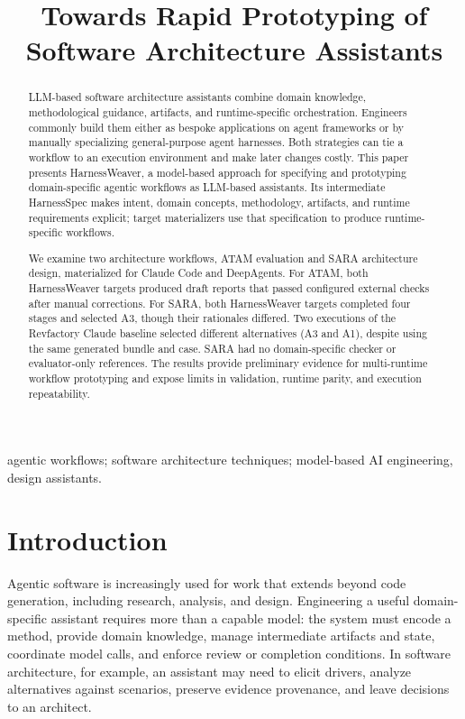 \documentclass[10pt,conference]{IEEEtran}
\title{Towards Rapid Prototyping of Software Architecture Assistants}
\author{\IEEEauthorblockN{Anonymous Author(s)}
}
\begin{document}
\maketitle
\begin{abstract}
LLM-based software architecture assistants combine domain knowledge, methodological guidance, artifacts, and runtime-specific orchestration. Engineers commonly build them either as bespoke applications on agent frameworks or by manually specializing general-purpose agent harnesses. Both strategies can tie a workflow to an execution environment and make later changes costly. This paper presents HarnessWeaver, a model-based approach for specifying and prototyping domain-specific agentic workflows as LLM-based assistants. Its intermediate HarnessSpec makes intent, domain concepts, methodology, artifacts, and runtime requirements explicit; target materializers use that specification to produce runtime-specific workflows.

We examine two architecture workflows, ATAM evaluation and SARA architecture design, materialized for Claude Code and DeepAgents. For ATAM, both HarnessWeaver targets produced draft reports that passed configured external checks after manual corrections. For SARA, both HarnessWeaver targets completed four stages and selected A3, though their rationales differed. Two executions of the Revfactory Claude baseline selected different alternatives (A3 and A1), despite using the same generated bundle and case. SARA had no domain-specific checker or evaluator-only references. The results provide preliminary evidence for multi-runtime workflow prototyping and expose limits in validation, runtime parity, and execution repeatability.
\end{abstract}
\begin{IEEEkeywords}
agentic workflows; software architecture techniques; model-based AI engineering, design assistants.
\end{IEEEkeywords}
\section{Introduction}

Agentic software is increasingly used for work that extends beyond code generation, including research, analysis, and design. Engineering a useful domain-specific assistant requires more than a capable model: the system must encode a method, provide domain knowledge, manage intermediate artifacts and state, coordinate model calls, and enforce review or completion conditions. In software architecture, for example, an assistant may need to elicit drivers, analyze alternatives against scenarios, preserve evidence provenance, and leave decisions to an architect.
\end{document}
